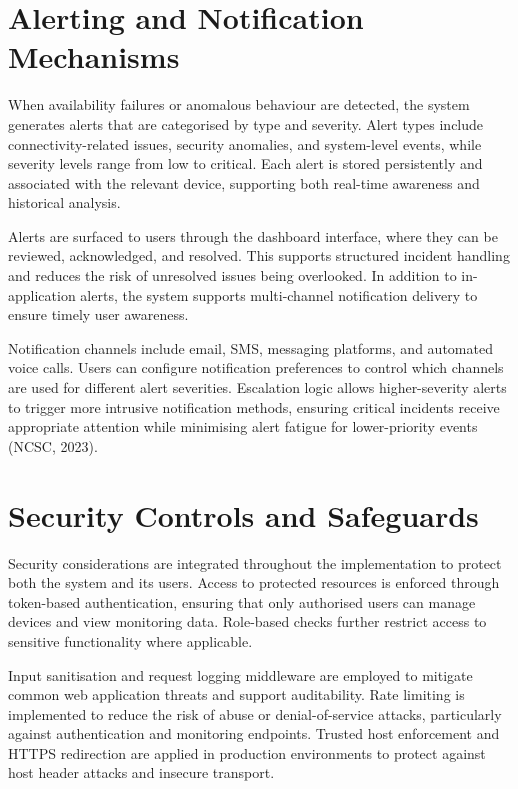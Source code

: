 \section{Alerting and Notification Mechanisms}

When availability failures or anomalous behaviour are detected, the system generates alerts that are categorised by type and severity. Alert types include connectivity-related issues, security anomalies, and system-level events, while severity levels range from low to critical. Each alert is stored persistently and associated with the relevant device, supporting both real-time awareness and historical analysis.

Alerts are surfaced to users through the dashboard interface, where they can be reviewed, acknowledged, and resolved. This supports structured incident handling and reduces the risk of unresolved issues being overlooked. In addition to in-application alerts, the system supports multi-channel notification delivery to ensure timely user awareness.

Notification channels include email, SMS, messaging platforms, and automated voice calls. Users can configure notification preferences to control which channels are used for different alert severities. Escalation logic allows higher-severity alerts to trigger more intrusive notification methods, ensuring critical incidents receive appropriate attention while minimising alert fatigue for lower-priority events (NCSC, 2023).

\section{Security Controls and Safeguards}

Security considerations are integrated throughout the implementation to protect both the system and its users. Access to protected resources is enforced through token-based authentication, ensuring that only authorised users can manage devices and view monitoring data. Role-based checks further restrict access to sensitive functionality where applicable.

Input sanitisation and request logging middleware are employed to mitigate common web application threats and support auditability. Rate limiting is implemented to reduce the risk of abuse or denial-of-service attacks, particularly against authentication and monitoring endpoints. Trusted host enforcement and HTTPS redirection are applied in production environments to protect against host header attacks and insecure transport.

